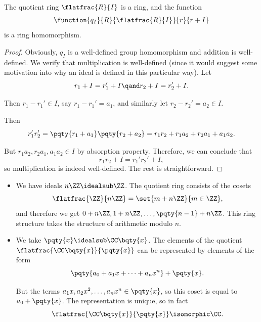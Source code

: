 \begin{proposition}
    \label{prop:quotient-ring-ring}%
    The quotient ring \(\flatfrac{R}{I}\) is a ring, and the function
    \[
        \function{q_I}{R}{\flatfrac{R}{I}}{r}{r + I}
    \]
    is a ring homomorphism.
\end{proposition}

\begin{proof}
    Obviously, \(q_I\) is a well-defined group homomorphism and addition is well-defined. We verify that multiplication is well-defined (since it would suggest some motivation into why an ideal is defined in this particular way). Let
    \[
        r_1 + I = r_1' + I \qand r_2 + I = r_2' + I.
    \]

    Then \(r_1 - r_1' \in I\), say \(r_1 - r_1' = a_1\), and similarly let \(r_2 - r_2' = a_2 \in I\).

    Then
    \[
        r_1' r_2' = \pqty{r_1 + a_1} \pqty{r_2 + a_2} = r_1 r_2 + r_1 a_2 + r_2 a_1 + a_1 a_2.
    \]

    But \(r_1 a_2, r_2 a_1, a_1 a_2 \in I\) by absorption property. Therefore, we can conclude that
    \[
        r_1 r_2 + I = r_1' r_2' + I,
    \]
    so multiplication is indeed well-defined. The rest is straightforward.
\end{proof}

\begin{example}
    \label{ex:quotients}%
    \begin{itemize}
        \item We have ideals \(n \ZZ \idealsub \ZZ\). The quotient ring consists of the cosets
        \[
            \flatfrac{\ZZ}{n \ZZ} = \set{m + n \ZZ}{m \in \ZZ},
        \]
        and therefore we get \(0 + n \ZZ, 1 + n \ZZ, \ldots, \pqty{n - 1} + n\ZZ\). This ring structure takes the structure of arithmetic modulo \(n\).

        \item We take \(\pqty{x} \idealsub \CC\bqty{x}\). The elements of the quotient \(\flatfrac{\CC\bqty{x}}{\pqty{x}}\) can be represented by elements of the form
        \[
            \pqty{a_0 + a_1 x + \cdots + a_n x^n} + \pqty{x}.
        \]

        But the terms \(a_1 x, a_2 x^2, \ldots, a_n x^n \in \pqty{x}\), so this coset is equal to \(a_0 + \pqty{x}\). The representation is unique, so in fact
        \[
            \flatfrac{\CC \bqty{x}}{\pqty{x}} \isomorphic \CC.
        \]
    \end{itemize}
\end{example}

